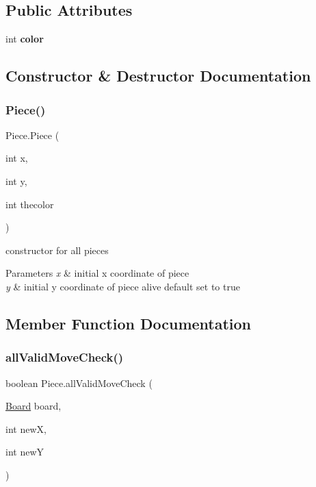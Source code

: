 \subsection*{Public Attributes}
\begin{DoxyCompactItemize}
\item 
\mbox{\label{class_piece_aa7b8cdc1df4652d4735965dc6c713b4d}} 
int {\bfseries color}
\end{DoxyCompactItemize}


\subsection{Constructor \& Destructor Documentation}
\mbox{\label{class_piece_a06b07b1389155f1c3831d3b16d38b277}} 
\subsubsection{\texorpdfstring{Piece()}{Piece()}}
{\footnotesize\ttfamily Piece.\+Piece (\begin{DoxyParamCaption}\item[{int}]{x,  }\item[{int}]{y,  }\item[{int}]{thecolor }\end{DoxyParamCaption})\hspace{0.3cm}{\ttfamily [inline]}}

constructor for all pieces 
\begin{DoxyParams}{Parameters}
{\em x} & initial x coordinate of piece \\
\hline
{\em y} & initial y coordinate of piece alive default set to true \\
\hline
\end{DoxyParams}


\subsection{Member Function Documentation}
\mbox{\label{class_piece_ad63ab469b35468ad133a3ea3626eb4e1}} 
\subsubsection{\texorpdfstring{allValidMoveCheck()}{allValidMoveCheck()}}
{\footnotesize\ttfamily boolean Piece.\+all\+Valid\+Move\+Check (\begin{DoxyParamCaption}\item[{\mbox{\hyperlink{class_board}{Board}}}]{board,  }\item[{int}]{newX,  }\item[{int}]{newY }\end{DoxyParamCaption})\hspace{0.3cm}{\ttfamily [inline]}}

